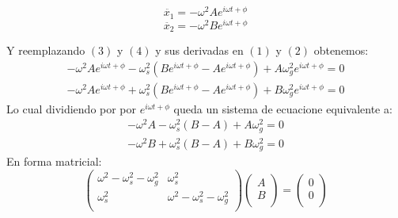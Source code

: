 \documentclass[a4paper]{article}
\begin{document}
\begin{answer}
\begin{enumerate}
         \begin{equation*}
            \ddot{x_1} = -\omega^2Ae^{i\omega t + \phi}
        \end{equation*}
          \begin{equation*}
            \ddot{x_2} = -\omega^2Be^{i\omega t + \phi}
        \end{equation*}
  
    Y reemplazando $(3)$ y $(4)$  y sus derivadas en $(1)$ y $(2)$ obtenemos:
    \begin{equation*}
        \begin{split}
          -\omega^2Ae^{i\omega t + \phi} - \omega_s^2( Be^{i\omega t + \phi} -Ae^{i\omega t + \phi}) + A\omega_g^2e^{i\omega t + \phi}=0
        \end{split}
    \end{equation*}
       \begin{equation*}
        \begin{split}
          -\omega^2Ae^{i\omega t + \phi} + \omega_s^2( Be^{i\omega t + \phi} -Ae^{i\omega t + \phi}) + B\omega_g^2e^{i\omega t + \phi}= 0
        \end{split}
    \end{equation*}
    Lo cual dividiendo por por $ e^{i\omega t + \phi}$ queda  un sistema de ecuacione equivalente a:
    \begin{equation*}
        \begin{split}
          -\omega^2A- \omega_s^2(B-A) + A\omega_g^2=0
        \end{split}
    \end{equation*}
       \begin{equation*}
        \begin{split}
          -\omega^2B + \omega_s^2( B -A) + B\omega_g^2= 0
        \end{split}
    \end{equation*}
      En forma matricial:
          \begin{equation*}
               \begin{pmatrix}
        \omega^2 - \omega_s^2 -\omega_g^2  & \omega_s^2\\
         \omega_s^2& \omega^2 - \omega_s^2 -\omega_g^2\\
    \end{pmatrix}
    \begin{pmatrix}
        A\\
        B\\
    \end{pmatrix} =  \begin{pmatrix}
        0\\
        0\\\end{pmatrix} 
          \end{equation*}
   

\end{enumerate}
\end{answer}
\end{document}
